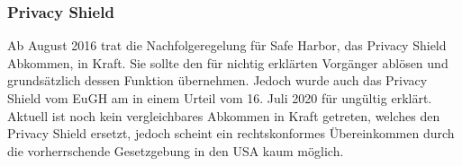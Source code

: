 \subsubsection{Privacy Shield}
    Ab August 2016 trat die Nachfolgeregelung für Safe Harbor, das Privacy Shield Abkommen, in Kraft. Sie sollte den für nichtig erklärten Vorgänger ablösen und grundsätzlich dessen Funktion übernehmen. Jedoch wurde auch das Privacy Shield vom EuGH am in einem Urteil vom 16. Juli 2020 für ungültig erklärt. Aktuell ist noch kein vergleichbares Abkommen in Kraft getreten, welches den Privacy Shield ersetzt, jedoch scheint ein rechtskonformes Übereinkommen durch die vorherrschende Gesetzgebung in den USA kaum möglich.
\vfill